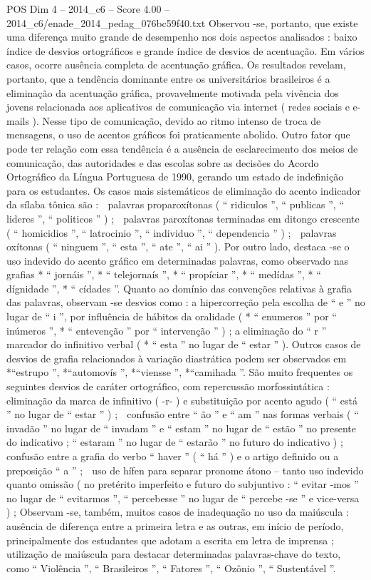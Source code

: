 \begin{textsample}{POS Dim 4 – 2014\_c6 – Score 4.00 – 2014\_c6/enade\_2014\_pedag\_076bc59f40.txt}
Observou -se, portanto, que existe uma diferença muito grande de desempenho nos dois aspectos analisados : baixo índice de desvios ortográficos e grande índice de desvios de acentuação.
Em vários casos, ocorre ausência completa de acentuação gráfica.
Os resultados revelam, portanto, que a tendência dominante entre os universitários brasileiros é a eliminação da acentuação gráfica, provavelmente motivada pela vivência dos jovens relacionada aos aplicativos de comunicação via internet ( redes sociais e e-mails ).
Nesse tipo de comunicação, devido ao ritmo intenso de troca de mensagens, o uso de acentos gráficos foi praticamente abolido.
Outro fator que pode ter relação com essa tendência é a ausência de esclarecimento dos meios de comunicação, das autoridades e das escolas sobre as decisões do Acordo Ortográfico da Língua Portuguesa de 1990, gerando um estado de indefinição para os estudantes.
Os casos mais sistemáticos de eliminação do acento indicador da sílaba tônica são :  palavras proparoxítonas ( “ ridiculos ”, “ publicas ”, “ lideres ”, “ politicos ” ) ;  palavras paroxítonas terminadas em ditongo crescente ( “ homicidios ”, “ latrocinio ”, “ individuo ”, “ dependencia ” ) ;  palavras oxítonas ( “ ninguem ”, “ esta ”, “ ate ”, “ ai ” ).
Por outro lado, destaca -se o uso indevido do acento gráfico em determinadas palavras, como observado nas grafias * “ jornáis ”, * “ telejornaís ”, * “ propíciar ”, * “ medídas ”, * “ dígnidade ”, * “ cídades ”.
Quanto ao domínio das convenções relativas à grafia das palavras, observam -se desvios como : a hipercorreção pela escolha de “ e ” no lugar de “ i ”, por influência de hábitos da oralidade ( * “ enumeros ” por “ inúmeros ”, * “ entevenção ” por “ intervenção ” ) ; a eliminação do “ r ” marcador do infinitivo verbal ( * “ esta ” no lugar de “ estar ” ).
Outros casos de desvios de grafia relacionados à variação diastrática podem ser observados em *“estrupo ”, *“automovís ”, *“viensse ”, *“camihada ”.
São muito frequentes os seguintes desvios de caráter ortográfico, com repercussão morfossintática :  eliminação da marca de infinitivo ( -r- ) e substituição por acento agudo ( “ está ” no lugar de “ estar ” ) ;  confusão entre “ ão ” e “ am ” nas formas verbais ( “ invadão ” no lugar de “ invadam ” e “ estam ” no lugar de “ estão ” no presente do indicativo ; “ estaram ” no lugar de “ estarão ” no futuro do indicativo ) ;  confusão entre a grafia do verbo “ haver ” ( “ há ” ) e o artigo definido ou a preposição “ a ” ;  uso de hífen para separar pronome átono – tanto uso indevido quanto omissão ( no pretérito imperfeito e futuro do subjuntivo : “ evitar -mos ” no lugar de “ evitarmos ”, “ percebesse ” no lugar de “ percebe -se ” e vice-versa ) ; Observam -se, também, muitos casos de inadequação no uso da maiúscula : ausência de diferença entre a primeira letra e as outras, em início de período, principalmente dos estudantes que adotam a escrita em letra de imprensa ; utilização de maiúscula para destacar determinadas palavras-chave do texto, como “ Violência ”, “ Brasileiros ”, “ Fatores ”, “ Ozônio ”, “ Sustentável ”.

\end{textsample}
